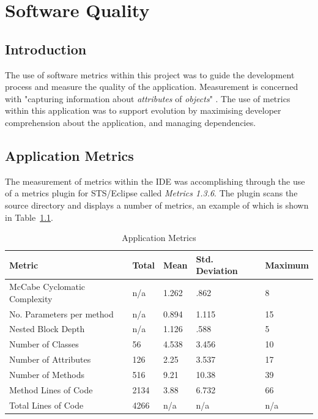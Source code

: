 \chapter{Software Quality}
\label{squality}

\section{Introduction}

The use of software metrics within this project was to guide the development process and measure the quality of the application. Measurement is concerned with "capturing information about \textit{attributes} of \textit{objects}" \parencite{softmetrics}. The use of metrics within this application was to support evolution by maximising developer comprehension about the application, and managing dependencies.

\section{Application Metrics}

The measurement of metrics within the IDE was accomplishing through the use of a metrics plugin for STS/Eclipse called \textit{Metrics 1.3.6}. The plugin scans the source directory and displays a number of metrics, an example of which is shown in Table~\ref{fig:metricstable}. 

\begin{table}[H]
\begin{center}
    \begin{tabular}{| l | l | l | l | p{2.3cm} |}
    \hline
    Metric & Total & Mean & Std. Deviation & Maximum\\ \hline
	McCabe Cyclomatic Complexity & n/a & 1.262 & .862 & 8\\ \hline
	No. Parameters per method & n/a & 0.894 & 1.115 & 15\\ \hline
	Nested Block Depth & n/a & 1.126 & .588 & 5\\ \hline
	Number of Classes & 56 & 4.538 & 3.456 & 10\\ \hline
	Number of Attributes & 126 & 2.25 & 3.537 & 17\\ \hline
	Number of Methods& 516 & 9.21 & 10.38 & 39\\ \hline
	Method Lines of Code& 2134 & 3.88 & 6.732 & 66\\ \hline
	Total Lines of Code& 4266 & n/a & n/a & n/a\\ \hline
    \end{tabular}
\end{center}
\caption{Application Metrics}
\label{fig:metricstable}
\end{table}

